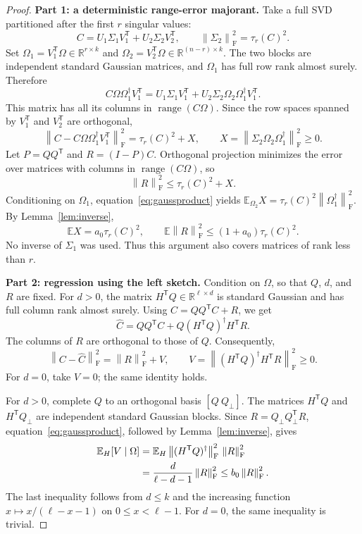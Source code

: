 \documentclass[11pt]{article}
\numberwithin{equation}{section}
\theoremstyle{remark}
\newcommand{\R}{\mathbb R}
\newcommand{\E}{\mathbb E}
\newcommand{\range}{\operatorname{range}}
\newcommand{\norm}[1]{\left\lVert #1\right\rVert_{\mathrm F}}
\newcommand{\T}{\mathsf T}
\begin{document}
\begin{proof}
\textbf{Part 1: a deterministic range-error majorant.}
Take a full SVD partitioned after the first $r$ singular values:
\[
 C=U_1\Sigma_1V_1^\T+U_2\Sigma_2V_2^\T,
 \qquad \norm{\Sigma_2}^2=\tau_r(C)^2.
\]
Set $\Omega_1=V_1^\T\Omega\in\R^{r\times k}$ and
$\Omega_2=V_2^\T\Omega\in\R^{(n-r)\times k}$. The two blocks are independent standard Gaussian matrices, and $\Omega_1$ has full row rank almost surely. Therefore
\[
 C\Omega\Omega_1^\dagger V_1^\T
 =U_1\Sigma_1V_1^\T+U_2\Sigma_2\Omega_2\Omega_1^\dagger V_1^\T.
\]
This matrix has all its columns in $\range(C\Omega)$. Since the row spaces spanned by $V_1^\T$ and $V_2^\T$ are orthogonal,
\begin{equation}\label{eq:rangemajorant}
 \norm{C-C\Omega\Omega_1^\dagger V_1^\T}^2
 =\tau_r(C)^2+X,\qquad
 X=\norm{\Sigma_2\Omega_2\Omega_1^\dagger}^2\ge0.
\end{equation}
Let $P=QQ^\T$ and $R=(I-P)C$. Orthogonal projection minimizes the error over matrices with columns in $\range(C\Omega)$, so
\begin{equation}\label{eq:rangebound}
 \norm R^2\le\tau_r(C)^2+X.
\end{equation}
Conditioning on $\Omega_1$, equation~\eqref{eq:gaussproduct} yields
$\E_{\Omega_2}X=\tau_r(C)^2\norm{\Omega_1^\dagger}^2$.
By Lemma~\ref{lem:inverse},
\begin{equation}\label{eq:EX}
 \E X=a_0\tau_r(C)^2,\qquad
 \E\norm R^2\le(1+a_0)\tau_r(C)^2.
\end{equation}
No inverse of $\Sigma_1$ was used. Thus this argument also covers matrices of rank less than $r$.

\textbf{Part 2: regression using the left sketch.}
Condition on $\Omega$, so that $Q$, $d$, and $R$ are fixed. For $d>0$, the matrix $H^\T Q\in\R^{\ell\times d}$ is standard Gaussian and has full column rank almost surely. Using $C=QQ^\T C+R$, we get
\[
 \widehat C=QQ^\T C+Q(H^\T Q)^\dagger H^\T R.
\]
The columns of $R$ are orthogonal to those of $Q$. Consequently,
\begin{equation}\label{eq:orthogonalerror}
 \norm{C-\widehat C}^2=\norm R^2+V,
 \qquad V=\norm{(H^\T Q)^\dagger H^\T R}^2\ge0.
\end{equation}
For $d=0$, take $V=0$; the same identity holds.

For $d>0$, complete $Q$ to an orthogonal basis $[Q\ Q_\perp]$.
The matrices $H^\T Q$ and $H^\T Q_\perp$ are independent standard Gaussian blocks. Since $R=Q_\perp Q_\perp^\T R$, equation~\eqref{eq:gaussproduct}, followed by Lemma~\ref{lem:inverse}, gives
\begin{align}
 \E_H[V\mid\Omega]
 &=\E_H\norm{(H^\T Q)^\dagger}^2\,\norm R^2\notag\\
 &=\frac{d}{\ell-d-1}\norm R^2
 \le b_0\norm R^2.\label{eq:EVconditional}
\end{align}
The last inequality follows from $d\le k$ and the increasing function
$x\mapsto x/(\ell-x-1)$ on $0\le x<\ell-1$.
For $d=0$, the same inequality is trivial.


\end{proof}
\end{document}
